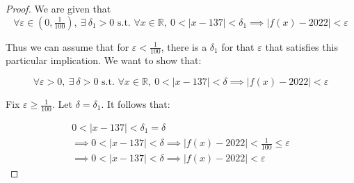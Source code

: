 \documentclass[12pt, a4paper]{article}
\renewcommand{\epsilon}{\varepsilon}
\newcommand{\R}{\mathbb{R}}
\begin{document}
\begin{proof}
    We are given that
    \[
        \forall \epsilon \in (0, \tfrac{1}{100}),\: \exists \: \delta_1 > 0 \text{ s.t. }
        \forall x \in \R,\: 0 < |x - 137| < \delta_1 \implies |f(x) - 2022| < \epsilon
    \]

    Thus we can assume that for $\epsilon < \tfrac{1}{100}$, there is a $\delta_1$ for that
    $\epsilon$ that satisfies this particular implication. We want to show that:

    \[
        \forall \epsilon > 0,\: \exists \: \delta > 0 \text{ s.t. }
        \forall x \in \R,\: 0 < |x - 137| < \delta \implies |f(x) - 2022| < \epsilon
    \]

    Fix $\epsilon \geq \tfrac{1}{100}$. Let $\delta = \delta_1$. It follows that:

    \begin{gather*}
        0 < |x - 137| < \delta_1 = \delta \\
        \implies 0 < |x - 137| < \delta \implies |f(x) - 2022| < \tfrac{1}{100} \leq \epsilon\\
        \implies 0 < |x - 137| < \delta \implies |f(x) - 2022| < \epsilon
    \end{gather*}
\end{proof}
\end{document}
